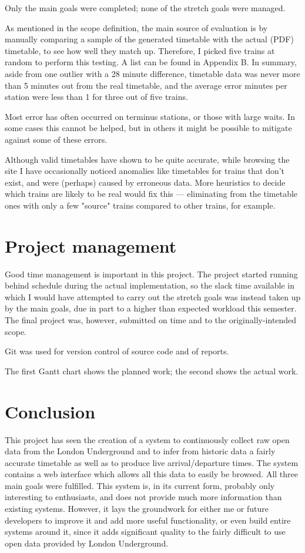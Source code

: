 \documentclass[a4paper,12pt]{report}
\begin{document}
Only the main goals were completed; none of the stretch goals were managed.

As mentioned in the scope definition, the main source of evaluation is by
manually comparing a sample of the generated timetable with the actual (PDF)
timetable, to see how well they match up. Therefore, I picked five trains at
random to perform this testing. A list can be found in Appendix B. In summary,
aside from one outlier with a 28 minute difference, timetable data was never
more than 5 minutes out from the real timetable, and the average error minutes
per station were less than 1 for three out of five trains.

Most error has often occurred on terminus stations, or those with large waits.
In some cases this cannot be helped, but in others it might be possible to
mitigate against some of these errors.

Although valid timetables have shown to be quite accurate, while browsing the
site I have occasionally noticed anomalies like timetables for trains that
don't exist, and were (perhaps) caused by erroneous data. More heuristics to
decide which trains are likely to be real would fix this --- eliminating from
the timetable ones with only a few "source" trains compared to other trains,
for example.

\chapter{Project management}

Good time management is important in this project. The project started running
behind schedule during the actual implementation, so the slack time available
in which I would have attempted to carry out the stretch goals was instead
taken up by the main goals, due in part to a higher than expected workload this
semester. The final project was, however, submitted on time and to the
originally-intended scope.

Git was used for version control of source code and of reports.

The first Gantt chart shows the planned work; the second shows the actual work.




\chapter{Conclusion}

This project has seen the creation of a system to continuously collect raw open
data from the London Underground and to infer from historic data a fairly
accurate timetable as well as to produce live arrival/departure times. The
system contains a web interface which allows all this data to easily be
browsed. All three main goals were fulfilled. This system is, in its current
form, probably only interesting to enthusiasts, and does not provide much more
information than existing systems. However, it lays the groundwork for either
me or future developers to improve it and add more useful functionality, or
even build entire systems around it, since it adds significant quality to the
fairly difficult to use open data provided by London Underground.
\end{document}
